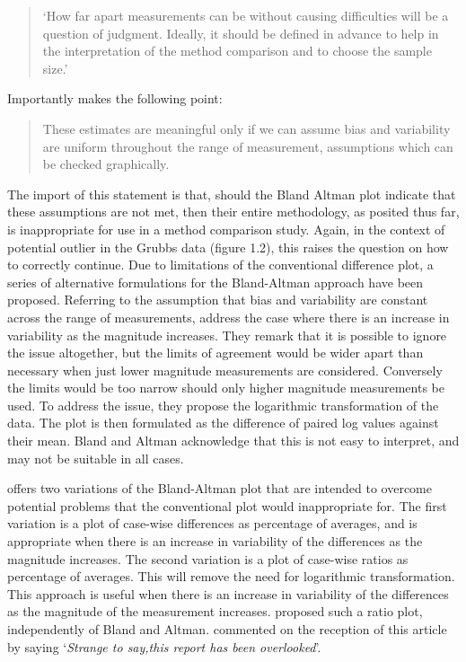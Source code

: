 \documentclass[12pt, a4paper]{report}
\theoremstyle{plain}
\theoremstyle{definition}
\theoremstyle{remark}
\begin{document}
\begin{quote}
	`How far apart measurements can be without causing difficulties
	will be a question of judgment. Ideally, it should be defined in
	advance to help in the interpretation of the method comparison and
	to choose the sample size.'\citep{BA86}
\end{quote}

Importantly \citet{BA99} makes the following point:
\begin{quote}These estimates are meaningful only if we can assume
	bias and variability are uniform throughout the range of
	measurement, assumptions which can be checked graphically.
\end{quote}

The import of this statement is that, should the Bland Altman plot indicate that these assumptions are not met, then their
entire methodology, as posited thus far, is inappropriate for use
in a method comparison study. Again, in the context of potential
outlier in the Grubbs data (figure 1.2), this raises the question
on how to correctly continue. Due to limitations of the conventional difference plot, a series of alternative formulations for the Bland-Altman approach have been proposed.
Referring to the assumption that bias and variability are constant across the range
of measurements, \citet{BA99} address the case where there is an increase in variability as the magnitude increases. They remark 	that it is possible to ignore the issue altogether, but the limits of agreement would be wider apart than necessary when just lower magnitude measurements are considered. Conversely the limits would be too narrow should only higher magnitude measurements be used. To address the issue, they propose the logarithmic transformation of the data. The plot is then formulated as the difference of paired log values against their mean. Bland and Altman acknowledge that this is not easy to interpret, and may not be suitable in all cases.

\citet{BA99} offers two variations of the Bland-Altman plot that are intended to overcome potential problems that the conventional
plot would inappropriate for. The first variation is a plot of case-wise differences as percentage of averages, and is
appropriate when there is an increase in variability of the differences as the magnitude increases. The second variation is a
plot of case-wise ratios as percentage of averages. This will remove the need for logarithmic transformation. This approach is useful
when there is an increase in variability of the differences as the magnitude of the measurement increases. \citet{Eksborg} proposed
such a ratio plot, independently of Bland and Altman. \citet{Dewitte} commented on the reception of this article by saying `\textit{Strange to say,this report has been overlooked}'.
	
\end{document}
